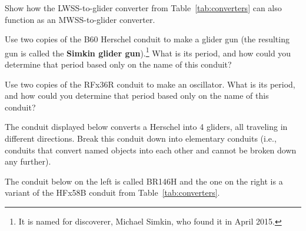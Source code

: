 \begin{multicols}{2}
	
	\mfilbreak
	
	
	\begin{problem}\label{exer:mwss_to_g} 
		Show how the LWSS-to-glider converter from Table~\ref{tab:converters} can also function as an MWSS-to-glider converter.
	\end{problem}
	
	
	\mfilbreak
	
	
	\begin{problemstar}\label{exer:simkin_glider_gun} 
		Use two copies of the B60 Herschel conduit to make a glider gun (the resulting gun is called the \textbf{Simkin glider gun}).\footnote{It is named for discoverer, Michael Simkin, who found it in April 2015.} What is its period, and how could you determine that period based only on the name of this conduit?
	\end{problemstar}
	
	
	\mfilbreak
	
	
	\begin{problem}\label{exer:RFx36R_osc} 
		Use two copies of the RFx36R conduit to make an oscillator. What is its period, and how could you determine that period based only on the name of this conduit?
	\end{problem}
	
	
	\mfilbreak
	
	
	\begin{problem}\label{exer:H_to_4G} 
		The conduit displayed below converts a Herschel into 4 gliders, all traveling in different directions. Break this conduit down into elementary conduits (i.e., conduits that convert named objects into each other and cannot be broken down any further).
		
		\begin{center}
		\end{center}
		
	\end{problem}
	
	
	\mfilbreak
	
	
	\begin{problemstar}\label{exer:HFx58B_modify} 
		The conduit below on the left is called BR146H and the one on the right is a variant of the HFx58B conduit from Table~\ref{tab:converters}.
		

\end{problemstar}
\end{multicols}
